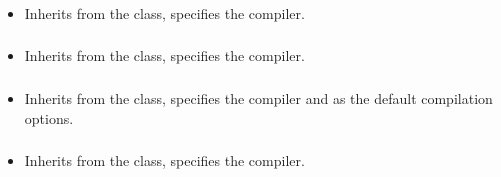 \subsubsection*{}\label{subsec:CompileC}

\begin{itemize}[label={}]
    \item Inherits from the \hyperref[subsec:CompileBase]{} class, specifies the 
          compiler.
\end{itemize}

\subsubsection*{}\label{subsec:CompileCpp}

\begin{itemize}[label={}]
    \item Inherits from the \hyperref[subsec:CompileBase]{} class, specifies the 
          compiler.
\end{itemize}

\subsubsection*{}\label{subsec:CompileCSharp}

\begin{itemize}[label={}]
    \item Inherits from the \hyperref[subsec:CompileBase]{} class, specifies the 
          compiler and  as the default compilation options.
\end{itemize}

\subsubsection*{}\label{subsec:CompileGo}

\begin{itemize}[label={}]
    \item Inherits from the \hyperref[subsec:CompileBase]{} class, specifies the 
          compiler.
\end{itemize}

\subsubsection*{}\label{subsec:CompileHaskell}

